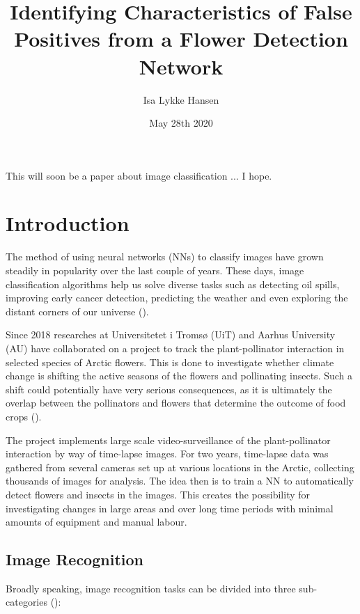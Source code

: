 \documentclass[12pt]{article}
\title{Identifying Characteristics of False Positives from a Flower Detection Network}
\author{Isa Lykke Hansen}
\date{May 28th 2020}
\begin{document}
\onehalfspacing

\begin{titlepage}
	\maketitle
	\newpage
\end{titlepage}

\abstract{}
This will soon be a paper about image classification ... I hope.
\clearpage
\tableofcontents
\clearpage

\section{Introduction}
The method of using neural networks (NNs) to classify images have grown steadily in popularity over the last couple of years. These days, image classification algorithms help us solve diverse tasks such as detecting oil spills, improving early cancer detection, predicting the weather and even exploring the distant corners of our universe (\cite{vestfalenAarhusHeleByen2019,ekiciBreastCancerDiagnosis2020,abhishekWeatherForecastingModel2012,krastevRealtimeDetectionGravitational2020}).

Since 2018 researches at Universitetet i Tromsø (UiT) and Aarhus University (AU) have collaborated on a project to track the plant-pollinator interaction in selected species of Arctic flowers. This is done to investigate whether climate change is shifting the active seasons of the flowers and pollinating insects. Such a shift could potentially have very serious consequences, as it is ultimately the overlap between the pollinators and flowers that determine the outcome of food crops (\cite{danmarksfrieforskningsfondAaretsOriginaleIde2019}).

The project implements large scale video-surveillance of the plant-pollinator interaction by way of time-lapse images. For two years, time-lapse data was gathered from several cameras set up at various locations in the Arctic, collecting thousands of images for analysis. The idea then is to train a NN to automatically detect flowers and insects in the images. This creates the possibility for investigating changes in large areas and over long time periods with minimal amounts of equipment and manual labour.

\subsection{Image Recognition}
Broadly speaking, image recognition tasks can be divided into three sub-categories (\cite{deeplearning.aiC4W3L01ObjectLocalization2017}):
\end{document}
